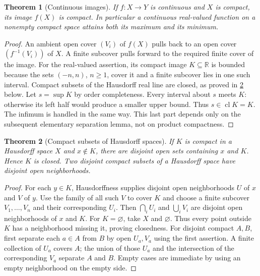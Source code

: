 \documentclass[11pt,oneside,openany]{book}
\newtheorem{theorem}{Theorem}[chapter]
\theoremstyle{definition}
\theoremstyle{remark}
\newcommand{\R}{\mathbb R}\newcommand{\C}{\mathbb C}
\DeclareMathOperator{\cl}{cl}
\begin{document}
\begin{theorem}[Continuous images]\label{d10:05:compact-image}
If $f:X\to Y$ is continuous and $X$ is compact, its image $f(X)$ is compact. In particular a continuous real-valued function on a nonempty compact space attains both its maximum and its minimum.
\end{theorem}
\begin{proof}
An ambient open cover $(V_i)$ of $f(X)$ pulls back to an open cover $(f^{-1}(V_i))$ of $X$. A finite subcover pulls forward to the required finite cover of the image. For the real-valued assertion, its compact image $K\subseteq\R$ is bounded because the sets $(-n,n)$, $n\ge1$, cover it and a finite subcover lies in one such interval. Compact subsets of the Hausdorff real line are closed, as proved in \cref{d10:05:compact-hausdorff} below. Let $s=\sup K$ by order completeness. Every interval about $s$ meets $K$: otherwise its left half would produce a smaller upper bound. Thus $s\in\cl K=K$. The infimum is handled in the same way. This last part depends only on the subsequent elementary separation lemma, not on product compactness.
\end{proof}

\begin{theorem}[Compact subsets of Hausdorff spaces]\label{d10:05:compact-hausdorff}
If $K$ is compact in a Hausdorff space $X$ and $x\notin K$, there are disjoint open sets containing $x$ and $K$. Hence $K$ is closed. Two disjoint compact subsets of a Hausdorff space have disjoint open neighborhoods.
\end{theorem}
\begin{proof}
For each $y\in K$, Hausdorffness supplies disjoint open neighborhoods $U$ of $x$ and $V$ of $y$. Use the family of all such $V$ to cover $K$ and choose a finite subcover $V_1,\ldots,V_n$ and their corresponding $U_i$. Then $\bigcap_iU_i$ and $\bigcup_iV_i$ are disjoint open neighborhoods of $x$ and $K$. For $K=\varnothing$, take $X$ and $\varnothing$. Thus every point outside $K$ has a neighborhood missing it, proving closedness. For disjoint compact $A,B$, first separate each $a\in A$ from $B$ by open $U_a,V_a$ using the first assertion. A finite collection of $U_a$ covers $A$; the union of those $U_a$ and the intersection of the corresponding $V_a$ separate $A$ and $B$. Empty cases are immediate by using an empty neighborhood on the empty side.
\end{proof}
\end{document}

